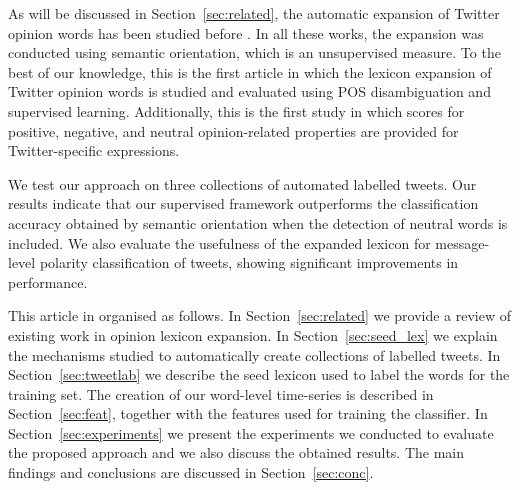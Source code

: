 \documentclass{sig-alternate}
\begin{document}
As will be discussed in Section~\ref{sec:related}, the automatic expansion of Twitter  opinion words has been studied before \cite{Mohammad2013, avaya2013, Zhou2014}. In all these works, the expansion was conducted using semantic orientation, which is an unsupervised measure.  
To the best of our knowledge, this is the first article in which the lexicon expansion of Twitter opinion words is studied and evaluated using POS disambiguation and supervised learning. Additionally, this is the first study in which scores for positive, negative, and neutral opinion-related properties are provided for Twitter-specific expressions.





 
We test our approach on three collections of automated labelled tweets. Our results indicate that our supervised framework outperforms the classification accuracy obtained by  semantic orientation when the detection of neutral words is included. We also evaluate the usefulness of the expanded lexicon for message-level polarity classification of tweets, showing significant improvements in performance.   
 
This article in organised as follows. In Section~\ref{sec:related} we provide a review of existing work in opinion lexicon expansion. In Section~\ref{sec:seed_lex} we explain the mechanisms studied to automatically create collections of labelled tweets. In Section~\ref{sec:tweetlab} we describe the seed lexicon used to label the words for the training set. The creation of our word-level time-series is described in Section~\ref{sec:feat}, together with the features used for training the classifier. In Section~\ref{sec:experiments} we present the experiments we conducted to evaluate the proposed approach and we also discuss the obtained results. The main findings and conclusions are discussed in Section~\ref{sec:conc}.
\end{document}
